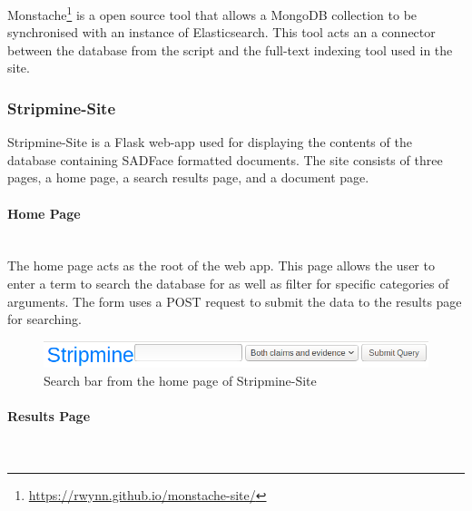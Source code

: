 \documentclass[12pt,a4paper]{article}
\begin{document}
Monstache\footnote{\url{https://rwynn.github.io/monstache-site/}} is a open source tool that allows a MongoDB collection to be synchronised with an instance of Elasticsearch. This tool acts an a connector between the database from the script and the full-text indexing tool used in the site. 

\subsubsection{Stripmine-Site}

Stripmine-Site is a Flask web-app used for displaying the contents of the database containing SADFace formatted documents. The site consists of three pages, a home page, a search results page, and a document page.

\paragraph{Home Page}\mbox{}\\

The home page acts as the root of the web app. This page allows the user to enter a term to search the database for as well as filter for specific categories of arguments. The form uses a POST request to submit the data to the results page for searching.

\begin{figure}[H]
    \centering
    \includegraphics[scale=0.5]{Report/graphics/home.png}
    \caption{Search bar from the home page of Stripmine-Site}
    \label{fig:home}
\end{figure}

\paragraph{Results Page}\mbox{}\\
\end{document}
